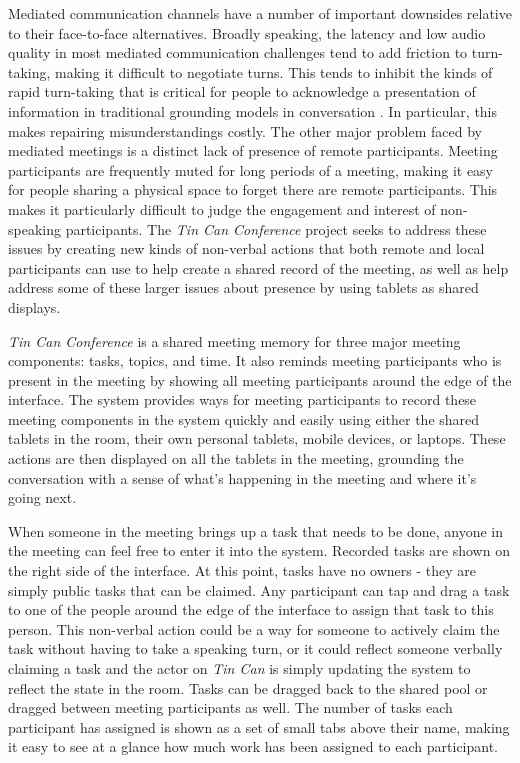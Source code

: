\documentclass{tufte-handout}
\begin{document}
Mediated communication channels have a number of important downsides relative to their face-to-face alternatives. Broadly speaking, the latency and low audio quality in most mediated communication challenges tend to add friction to turn-taking, making it difficult to negotiate turns. \citep{Brennan:1991wk} This tends to inhibit the kinds of rapid turn-taking that is critical for people to acknowledge a presentation of information in traditional grounding models in conversation \citep{Clark:1989uc}. In particular, this makes repairing misunderstandings costly. The other major problem faced by mediated meetings is a distinct lack of presence of remote participants. Meeting participants are frequently muted for long periods of a meeting, making it easy for people sharing a physical space to forget there are remote participants. This makes it particularly difficult to judge the engagement and interest of non-speaking participants. The \emph{Tin Can Conference} project seeks to address these issues by creating new kinds of non-verbal actions that both remote and local participants can use to help create a shared record of the meeting, as well as help address some of these larger issues about presence by using tablets as shared displays.



\emph{Tin Can Conference} is a shared meeting memory for three major meeting components: tasks, topics, and time. It also reminds meeting participants who is present in the meeting by showing all meeting participants around the edge of the interface. The system provides ways for meeting participants to record these meeting components in the system quickly and easily using either the shared tablets in the room, their own personal tablets, mobile devices, or laptops. These actions are then displayed on all the tablets in the meeting, grounding the conversation with a sense of what's happening in the meeting and where it's going next.

When someone in the meeting brings up a task that needs to be done, anyone in the meeting can feel free to enter it into the system. Recorded tasks are shown on the right side of the interface. At this point, tasks have no owners - they are simply public tasks that can be claimed. Any participant can tap and drag a task to one of the people around the edge of the interface to assign that task to this person. This non-verbal action could be a way for someone to actively claim the task without having to take a speaking turn, or it could reflect someone verbally claiming a task and the actor on \emph{Tin Can} is simply updating the system to reflect the state in the room. Tasks can be dragged back to the shared pool or dragged between meeting participants as well. The number of tasks each participant has assigned is shown as a set of small tabs above their name, making it easy to see at a glance how much work has been assigned to each participant.
\end{document}
